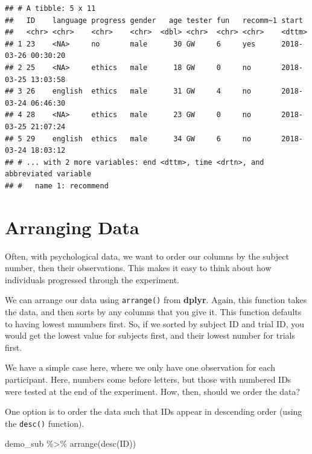 \documentclass[
]{book}
\newenvironment{Shaded}{\begin{snugshade}}{\end{snugshade}}
\newcommand{\FunctionTok}[1]{\textcolor[rgb]{0.00,0.00,0.00}{#1}}
\newcommand{\NormalTok}[1]{#1}
\newcommand{\SpecialCharTok}[1]{\textcolor[rgb]{0.00,0.00,0.00}{#1}}
\begin{document}
\begin{verbatim}
## # A tibble: 5 x 11
##   ID    language progress gender   age tester fun   recomm~1 start              
##   <chr> <chr>    <chr>    <chr>  <dbl> <chr>  <chr> <chr>    <dttm>             
## 1 23    <NA>     no       male      30 GW     6     yes      2018-03-26 00:30:20
## 2 25    <NA>     ethics   male      18 GW     0     no       2018-03-25 13:03:58
## 3 26    english  ethics   male      31 GW     4     no       2018-03-24 06:46:30
## 4 28    <NA>     ethics   male      23 GW     0     no       2018-03-25 21:07:24
## 5 29    english  ethics   male      34 GW     6     no       2018-03-24 18:03:12
## # ... with 2 more variables: end <dttm>, time <drtn>, and abbreviated variable
## #   name 1: recommend
\end{verbatim}

\hypertarget{arranging-data}{%
\section{Arranging Data}\label{arranging-data}}

Often, with psychological data, we want to order our columns by the subject number, then their observations. This makes it easy to think about how individuals progressed through the experiment.

We can arrange our data using \texttt{arrange()} from \textbf{dplyr}. Again, this function takes the data, and then sorts by any columns that you give it. This function defaults to having lowest mnumbers first. So, if we sorted by subject ID and trial ID, you would get the lowest value for subjects first, and their lowest number for trials first.

We have a simple case here, where we only have one observation for each participant. Here, numbers come before letters, but those with numbered IDs were tested at the end of the experiment. How, then, should we order the data?

One option is to order the data such that IDs appear in descending order (using the \texttt{desc()} function).

\begin{Shaded}
\begin{Highlighting}[]
\NormalTok{demo\_sub }\SpecialCharTok{\%\textgreater{}\%} \FunctionTok{arrange}\NormalTok{(}\FunctionTok{desc}\NormalTok{(ID))}
\end{Highlighting}
\end{Shaded}
\end{document}
